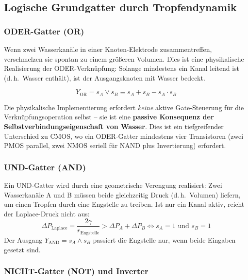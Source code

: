 ﻿\documentclass[a4paper,12pt]{scrreprt}
\theoremstyle{definition}
\begin{document}
\subsection{Logische Grundgatter durch Tropfendynamik}

\subsubsection{ODER-Gatter (OR)}

Wenn zwei Wasserkanäle in einer Knoten-Elektrode zusammentreffen,
verschmelzen sie spontan zu einem größeren Volumen. Dies ist eine
physikalische Realisierung der ODER-Verknüpfung: Solange mindestens
ein Kanal leitend ist (d.\,h.\ Wasser enthält), ist der Ausgangsknoten
mit Wasser bedeckt.

\begin{equation}
	Y_{\mathrm{OR}} = s_{A} \lor s_{B} \equiv s_A + s_B - s_A \cdot s_B
	\label{eq:or_gatter}
\end{equation}

Die physikalische Implementierung erfordert \emph{keine} aktive Gate-Steuerung
für die Verknüpfungsoperation selbst -- sie ist eine \textbf{passive Konsequenz
	der Selbstverbindungseigenschaft von Wasser}. Dies ist ein tiefgreifender
Unterschied zu CMOS, wo ein ODER-Gatter mindestens vier Transistoren
(zwei PMOS parallel, zwei NMOS seriell für NAND plus Invertierung) erfordert.

\subsubsection{UND-Gatter (AND)}

Ein UND-Gatter wird durch eine geometrische Verengung realisiert: Zwei
Wasserkanäle A und B müssen beide gleichzeitig Druck (d.\,h.\ Volumen) liefern,
um einen Tropfen durch eine Engstelle zu treiben. Ist nur ein Kanal aktiv,
reicht der Laplace-Druck nicht aus:
\begin{equation}
	\Delta P_{\mathrm{Laplace}} = \frac{2\gamma}{r_{\mathrm{Engstelle}}} > \Delta P_A + \Delta P_B
	\Leftrightarrow s_A = 1 \text{ und } s_B = 1
	\label{eq:und_bedingung}
\end{equation}
Der Ausgang $Y_{\mathrm{AND}} = s_A \land s_B$ passiert die Engstelle nur,
wenn beide Eingaben gesetzt sind.

\subsubsection{NICHT-Gatter (NOT) und Inverter}
\end{document}
